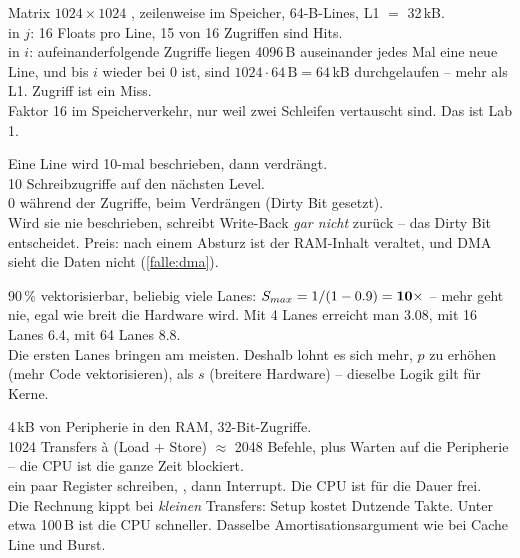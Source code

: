 \begin{bsp}
Matrix $1024\times1024$ , zeilenweise im Speicher,
64-B-Lines, L1 $=$ 32\,kB.\\
  in $j$: 16 Floats pro Line, 15 von 16
Zugriffen sind Hits.\\
  in $i$: aufeinanderfolgende Zugriffe liegen
4096\,B auseinander \ra jedes Mal eine neue Line, und bis $i$ wieder bei
0 ist, sind $1024 \cdot 64\,\text{B} = 64\,$kB durchgelaufen -- mehr als
L1.  Zugriff ist ein Miss.\\[2pt]
\merkzeile Faktor 16 im Speicherverkehr, nur weil zwei Schleifen
vertauscht sind. Das ist Lab 1.
\end{bsp}

\begin{bsp}
Eine Line wird 10-mal beschrieben, dann verdrängt.\\
 10 Schreibzugriffe auf den nächsten Level.\\
 0 während der Zugriffe,  beim Verdrängen (Dirty
Bit gesetzt).\\
Wird sie nie beschrieben, schreibt Write-Back \emph{gar nicht} zurück --
das Dirty Bit entscheidet. Preis: nach einem Absturz ist der RAM-Inhalt
veraltet, und DMA sieht die Daten nicht (\ref{falle:dma}).
\end{bsp}

\begin{bsp}
90\,\% vektorisierbar, beliebig viele Lanes:
$S_{max} = 1/(1-0.9) = \textbf{10}\times$ -- mehr geht nie, egal wie breit
die Hardware wird. Mit 4 Lanes erreicht man 3.08, mit 16 Lanes 6.4, mit
64 Lanes 8.8.\\
\merkzeile Die ersten Lanes bringen am meisten. Deshalb lohnt es sich
mehr, $p$ zu erhöhen (mehr Code vektorisieren), als $s$
(breitere Hardware) -- dieselbe Logik gilt für Kerne.
\end{bsp}

\begin{bsp}
4\,kB von Peripherie in den RAM, 32-Bit-Zugriffe.\\
 1024 Transfers à (Load $+$ Store) $\approx$ 2048 Befehle, plus
Warten auf die Peripherie -- die CPU ist die ganze Zeit blockiert.\\
 ein paar Register schreiben, , dann Interrupt. Die CPU
ist für die Dauer frei.\\
\merkzeile Die Rechnung kippt bei \emph{kleinen} Transfers: Setup kostet
Dutzende Takte. Unter etwa 100\,B ist die CPU schneller. Dasselbe
Amortisationsargument wie bei Cache Line und Burst.
\end{bsp}

